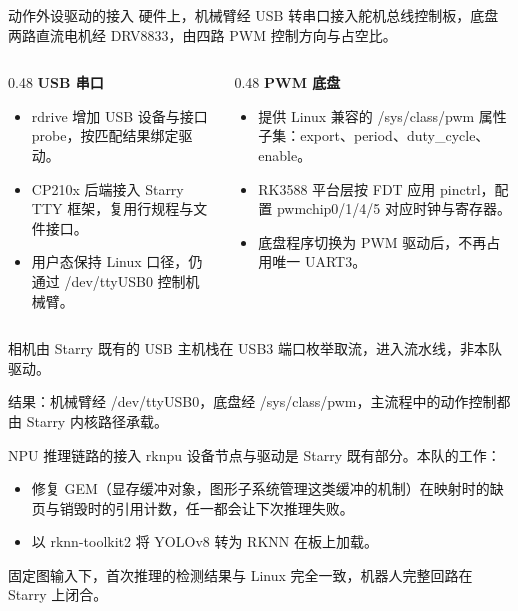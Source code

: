 \documentclass[aspectratio=169,fontset=mac]{ctexbeamer}
\newcommand{\keyline}[1]{\par\vskip3pt\noindent\colorbox{tintbox}{\parbox{0.91\textwidth}{\color{ink}#1}}\par}
\begin{document}
\begin{frame}{动作外设驱动的接入}
\small
硬件上，机械臂经 USB 转串口接入舵机总线控制板，底盘两路直流电机经 DRV8833，由四路 PWM 控制方向与占空比。
\vskip4pt
\begin{columns}[T]
\begin{column}{0.48\textwidth}
\textbf{\color{ink}USB 串口}\\[2pt]
\begin{itemize}\footnotesize
\item rdrive 增加 USB 设备与接口 probe，按匹配结果绑定驱动。
\item CP210x 后端接入 Starry TTY 框架，复用行规程与文件接口。
\item 用户态保持 Linux 口径，仍通过 /dev/ttyUSB0 控制机械臂。
\end{itemize}
\end{column}
\begin{column}{0.48\textwidth}
\textbf{\color{ink}PWM 底盘}\\[2pt]
\begin{itemize}\footnotesize
\item 提供 Linux 兼容的 /sys/class/pwm 属性子集：export、period、duty\_cycle、enable。
\item RK3588 平台层按 FDT 应用 pinctrl，配置 pwmchip0/1/4/5 对应时钟与寄存器。
\item 底盘程序切换为 PWM 驱动后，不再占用唯一 UART3。
\end{itemize}
\end{column}
\end{columns}
\vskip4pt
\footnotesize 相机由 Starry 既有的 USB 主机栈在 USB3 端口枚举取流，进入流水线，非本队驱动。
\keyline{结果：机械臂经 /dev/ttyUSB0，底盘经 /sys/class/pwm，主流程中的动作控制都由 Starry 内核路径承载。}
\end{frame}

\begin{frame}{NPU 推理链路的接入}
rknpu 设备节点与驱动是 Starry 既有部分。本队的工作：
\begin{itemize}
\item 修复 GEM（显存缓冲对象，图形子系统管理这类缓冲的机制）在映射时的缺页与销毁时的引用计数，任一都会让下次推理失败。
\item 以 rknn-toolkit2 将 YOLOv8 转为 RKNN 在板上加载。
\end{itemize}
\keyline{固定图输入下，首次推理的检测结果与 Linux 完全一致，机器人完整回路在 Starry 上闭合。}
\end{frame}
\end{document}
